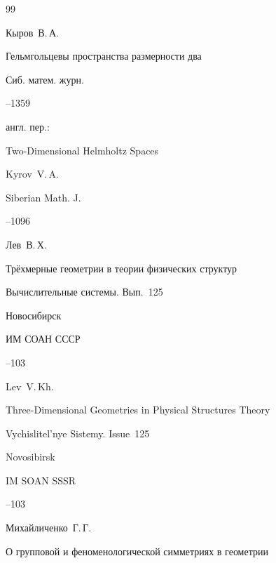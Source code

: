 \begin{thebibliography}{99}




\by Кыров~В.\,А.

\paper Гельмгольцевы пространства размерности два

\jour Сиб. матем. журн.




--1359

\transl англ. пер.:~

\paper Two-Dimensional Helmholtz Spaces

\by  Kyrov~V.\,A.

\jour Siberian Math. J.




--1096




\by Лев~В.\,Х.

\paper Трёхмерные геометрии в теории физических структур

\inbook Вычислительные системы. {\rm Вып.~125}

\publaddr Новосибирск

\publ ИМ СОАН СССР


--103

\misctransl

\by Lev~V.\,Kh.

\paper Three-Dimensional Geometries in Physical Structures Theory

\inbook Vychislitel'nye Sistemy. {\rm Issue~125}

\publaddr Novosibirsk

\publ IM SOAN SSSR


--103










\by Михайличенко~Г.\,Г.

\paper О групповой и феноменологической симметриях в геометрии


\end{thebibliography}
